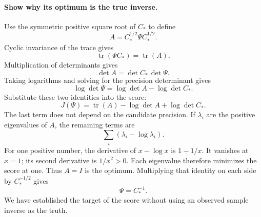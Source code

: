 \documentclass[11pt]{article}
\begin{document}
\paragraph{Show why its optimum is the true inverse.}
Use the symmetric positive square root of $C_*$ to define
\begin{equation}
 A=C_*^{1/2}\Psi C_*^{1/2}.
\end{equation}
Cyclic invariance of the trace gives
\begin{equation}
 \operatorname{tr}(\Psi C_*)=\operatorname{tr}(A).
\end{equation}
Multiplication of determinants gives
\begin{equation}
 \det A=\det C_*\,\det\Psi.
\end{equation}
Taking logarithms and solving for the precision determinant gives
\begin{equation}
 \log\det\Psi=\log\det A-\log\det C_*.
\end{equation}
Substitute these two identities into the score:
\begin{equation}
 J(\Psi)=\operatorname{tr}(A)-\log\det A+\log\det C_*.
\end{equation}
The last term does not depend on the candidate precision. If $\lambda_i$
are the positive eigenvalues of $A$, the remaining terms are
\begin{equation}
 \sum_i\left(\lambda_i-\log\lambda_i\right).
\end{equation}
For one positive number, the derivative of $x-\log x$ is $1-1/x$.
It vanishes at $x=1$; its second derivative is $1/x^2>0$. Each eigenvalue
therefore minimizes the score at one. Thus $A=I$ is the optimum. Multiplying
that identity on each side by $C_*^{-1/2}$ gives
\begin{equation}
 \Psi=C_*^{-1}.
\end{equation}
We have established the target of the score without using an observed
sample inverse as the truth.
\end{document}

